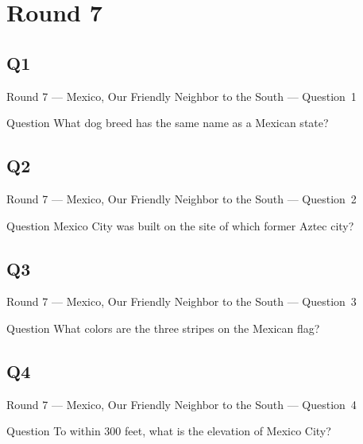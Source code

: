 \documentclass[11pt,draft]{beamer}
\begin{document}
\section{Round 7}
\subsection*{Q1}
\begin{frame}[t]{Round 7 --- Mexico, Our Friendly Neighbor to the South --- \mbox{Question 1}}
    \begin{block}{Question}
        What dog breed has the same name as a Mexican state?
    \end{block}
\end{frame}
\subsection*{Q2}
\begin{frame}[t]{Round 7 --- Mexico, Our Friendly Neighbor to the South --- \mbox{Question 2}}
    \begin{block}{Question}
        Mexico City was built on the site of which former Aztec city?
    \end{block}
\end{frame}
\subsection*{Q3}
\begin{frame}[t]{Round 7 --- Mexico, Our Friendly Neighbor to the South --- \mbox{Question 3}}
    \begin{block}{Question}
        What colors are the three stripes on the Mexican flag?
    \end{block}
\end{frame}
\subsection*{Q4}
\begin{frame}[t]{Round 7 --- Mexico, Our Friendly Neighbor to the South --- \mbox{Question 4}}
    \begin{block}{Question}
        To within 300 feet, what is the elevation of Mexico City?
    \end{block}
\end{frame}
\end{document}
